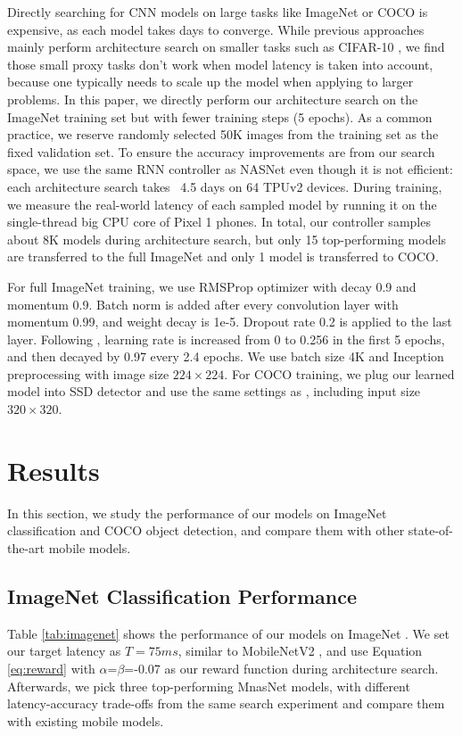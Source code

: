 \documentclass[10pt,twocolumn,letterpaper]{article}
\begin{document}
Directly searching for CNN models on large tasks like ImageNet or COCO is expensive, as each model takes days to converge. While previous approaches mainly perform architecture search on smaller tasks such as CIFAR-10 \cite{nas_imagenet18,amoebanets18}, we find those small proxy tasks don't work when model latency is taken into account, because one typically needs to scale up the model when applying to larger problems. In this paper, we directly perform our architecture search on the ImageNet training set but with fewer training steps (5 epochs). As a common practice, we reserve randomly selected 50K images from the training set as the fixed validation set. 
To ensure the accuracy improvements are from our
search space, we use the same RNN controller as NASNet \cite{nas_imagenet18} even though it is not efficient: each architecture search takes ~4.5 days on 64 TPUv2 devices. During training, we measure the real-world latency of each sampled model by running it on the single-thread big CPU core of Pixel 1 phones. In total, our controller samples about 8K models during architecture search, but only 15 top-performing models are transferred to the full ImageNet and only 1 model is transferred to  COCO. 

For full ImageNet training, we use RMSProp optimizer with decay 0.9 and momentum 0.9. Batch norm is added after every convolution layer with momentum 0.99, and weight decay is 1e-5. Dropout rate 0.2 is applied to the last layer. Following \cite{imagenet1hour17}, learning rate is increased from 0 to 0.256 in the first 5 epochs, and then decayed by 0.97 every 2.4 epochs.
We use batch size 4K and  Inception preprocessing with image size $224 \times 224$. For COCO training, we plug our learned model into SSD detector \cite{ssd16} and use the same settings as \cite{mobilenetv218}, including  input size $320\times 320$.


\section{Results}
\label{sec:results}


In this section, we study the performance of our models on ImageNet classification and COCO object detection, and compare them with other state-of-the-art mobile models.



\subsection{ImageNet Classification Performance}
Table \ref{tab:imagenet} shows the performance of our models on ImageNet \cite{imagenet15}. We set our target latency as $T=75ms$, similar to MobileNetV2 \cite{mobilenetv218}, and use Equation \ref{eq:reward} with $\alpha$=$\beta$=-0.07 as our reward function during architecture search. Afterwards, we pick three top-performing MnasNet models, with different latency-accuracy trade-offs from the same search experiment and compare them with existing mobile  models.
\end{document}

